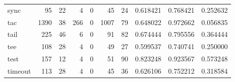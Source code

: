 \begin{tabular}{lrrrrrrrrr}
sync      &                                                 95 &                                                 22 &                                                  4 &                                                  0 &                                                 45 &                                                 24 &                                           0.618421 &                               0.768421 &                             0.252632 \\
tac       &                                               1390 &                                                 38 &                                                266 &                                                  0 &                                               1007 &                                                 79 &                                           0.648022 &                               0.972662 &                             0.056835 \\
tail      &                                                225 &                                                 46 &                                                  6 &                                                  0 &                                                 91 &                                                 82 &                                           0.674444 &                               0.795556 &                             0.364444 \\
tee       &                                                108 &                                                 28 &                                                  4 &                                                  0 &                                                 49 &                                                 27 &                                           0.599537 &                               0.740741 &                             0.250000 \\
test      &                                                157 &                                                 12 &                                                  4 &                                                  0 &                                                 51 &                                                 90 &                                           0.823248 &                               0.923567 &                             0.573248 \\
timeout   &                                                113 &                                                 28 &                                                  4 &                                                  0 &                                                 45 &                                                 36 &                                           0.626106 &                               0.752212 &                             0.318584 \\

\end{tabular}
